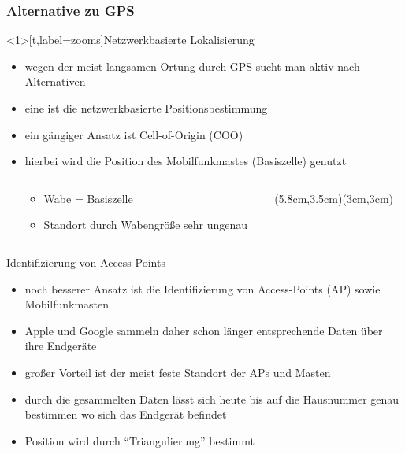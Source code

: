 \subsubsection{Alternative zu GPS}
\begin{frame}<1>[t,label=zooms]{Netzwerkbasierte Lokalisierung}
\begin{itemize}
  \item wegen der meist langsamen Ortung durch GPS sucht man aktiv nach Alternativen
  \item eine ist die netzwerkbasierte Positionsbestimmung
  \item ein gängiger Ansatz ist Cell-of-Origin (COO)
  \item hierbei wird die Position des Mobilfunkmastes (Basiszelle) genutzt
  \begin{columns}
  \begin{column}{.47\textwidth}
  \begin{itemize}
  \vspace{-2cm}
  \normalsize \item Wabe = Basiszelle
  \item Standort durch Wabengröße sehr ungenau 
  \end{itemize}
  \end{column}
  \begin{column}{.45\textwidth}
  \begin{center}
  \vspace{-0.5cm}
  (5.8cm,3.5cm)(3cm,3cm)
  \end{center}
  \end{column}
  \end{columns}
\end{itemize}
\end{frame}

\begin{frame}{Identifizierung von Access-Points}
\begin{itemize}
  \item noch besserer Ansatz ist die Identifizierung von Access-Points (AP) sowie Mobilfunkmasten
  \item Apple und Google sammeln daher schon länger entsprechende Daten über ihre Endgeräte
  \item großer Vorteil ist der meist feste Standort der APs und Masten
  \item durch die gesammelten Daten lässt sich heute bis auf die Hausnummer genau bestimmen wo sich das Endgerät befindet
  \item Position wird durch "`Triangulierung"' bestimmt
\end{itemize}
\end{frame}

